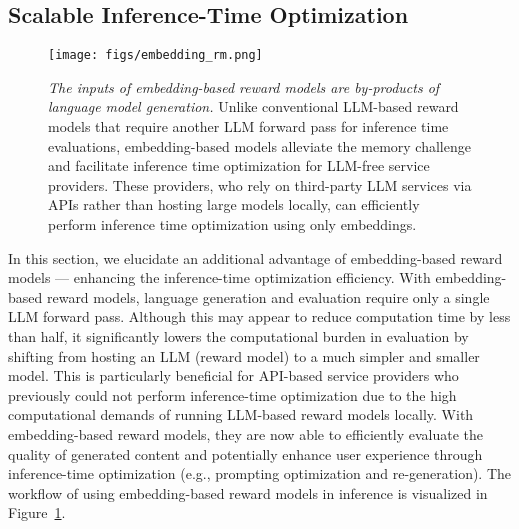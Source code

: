 







\subsection{Scalable Inference-Time Optimization}
\label{sec:cheap_inference}
\begin{figure}[h!]
\vspace{-0.15cm}
    \texttt{[image: figs/embedding\_rm.png]}
    \vspace{-0.6cm}
    \caption{\small \textit{The inputs of embedding-based reward models are by-products of language model generation.} Unlike conventional LLM-based reward models that require another LLM forward pass for inference time evaluations, embedding-based models alleviate the memory challenge and facilitate inference time optimization for LLM-free service providers. These providers, who rely on third-party LLM services via APIs rather than hosting large models locally, can efficiently perform inference time optimization using only embeddings.}  \vspace{-0.1cm}
    \label{fig:fast_inference}
\end{figure}

In this section, we elucidate an additional advantage of embedding-based reward models --- enhancing the inference-time optimization efficiency. With embedding-based reward models, language generation and evaluation require only a single LLM forward pass. Although this may appear to reduce computation time by less than half, it significantly lowers the computational burden in evaluation by shifting from hosting an LLM (reward model) to a much simpler and smaller model. This is particularly beneficial for API-based service providers who previously could not perform inference-time optimization due to the high computational demands of running LLM-based reward models locally. With embedding-based reward models, they are now able to efficiently evaluate the quality of generated content and potentially enhance user experience through inference-time optimization (e.g., prompting optimization and re-generation). The workflow of using embedding-based reward models in inference is visualized in Figure~\ref{fig:fast_inference}.










